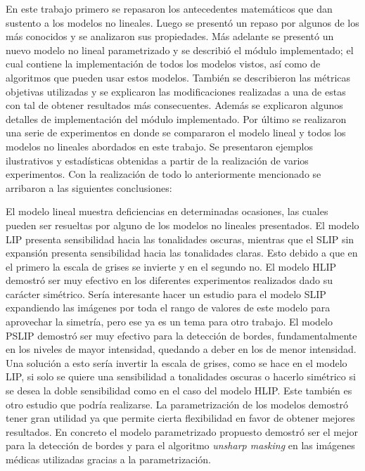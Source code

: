 \begin{conclusions}
    En este trabajo primero se repasaron los antecedentes matem\'aticos que dan sustento a los modelos no lineales. Luego se present\'o un repaso por algunos de los m\'as conocidos y se analizaron sus propiedades. M\'as adelante se present\'o un nuevo modelo no lineal parametrizado y se describi\'o el m\'odulo implementado; el cual contiene la implementaci\'on de todos los modelos vistos, as\'i como de algoritmos que pueden usar estos modelos. Tambi\'en se describieron las m\'etricas objetivas utilizadas y se explicaron las modificaciones realizadas a una de estas con tal de obtener resultados m\'as consecuentes. Adem\'as se explicaron algunos detalles de implementaci\'on del m\'odulo implementado. Por \'ultimo se realizaron una serie de experimentos en donde se compararon el modelo lineal y todos los modelos no lineales abordados en este trabajo. Se presentaron ejemplos ilustrativos y estad\'isticas obtenidas a partir de la realizaci\'on de varios experimentos. Con la realizaci\'on de todo lo anteriormente mencionado se arribaron a las siguientes conclusiones:
    
    El modelo lineal muestra deficiencias en determinadas ocasiones, las cuales pueden ser resueltas por alguno de los modelos no lineales presentados. El modelo LIP presenta sensibilidad hacia las tonalidades oscuras, mientras que el SLIP sin expansi\'on presenta sensibilidad hacia las tonalidades claras. Esto debido a que en el primero la escala de grises se invierte y en el segundo no. El modelo HLIP demostr\'o ser muy efectivo en los diferentes experimentos realizados dado su car\'acter sim\'etrico. Ser\'ia interesante hacer un estudio para el modelo SLIP expandiendo las im\'agenes por toda el rango de valores de este modelo para aprovechar la simetr\'ia, pero ese ya es un tema para otro trabajo. El modelo PSLIP demostr\'o ser muy efectivo para la detecci\'on de bordes, fundamentalmente en los niveles de mayor intensidad, quedando a deber en los de menor intensidad. Una soluci\'on a esto ser\'ia invertir la escala de grises, como se hace en el modelo LIP, si solo se quiere una sensibilidad a tonalidades oscuras o hacerlo sim\'etrico si se desea la doble sensibilidad como en el caso del modelo HLIP. Este tambi\'en es otro estudio que podr\'ia realizarse. La parametrizaci\'on de los modelos demostr\'o tener gran utilidad ya que permite cierta flexibilidad en favor de obtener mejores resultados. En concreto el modelo parametrizado propuesto demostr\'o ser el mejor para la detecci\'on de bordes y para el algoritmo  \textit{unsharp masking} en las im\'agenes m\'edicas utilizadas gracias a la parametrizaci\'on.
    

\end{conclusions}
